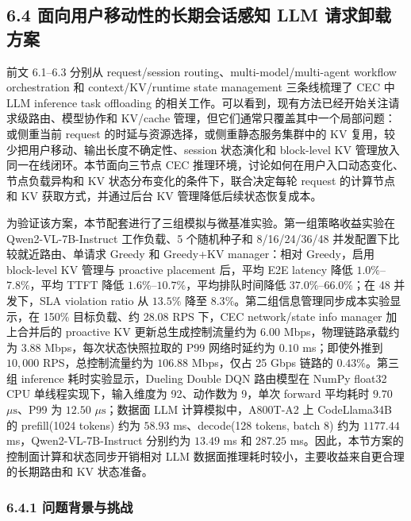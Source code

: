 \subsection*{6.4 面向用户移动性的长期会话感知 LLM 请求卸载方案}

前文 6.1--6.3 分别从 request/session routing、multi-model/multi-agent workflow orchestration 和 context/KV/runtime state management 三条线梳理了 CEC 中 LLM inference task offloading 的相关工作。可以看到，现有方法已经开始关注请求级路由、模型协作和 KV/cache 管理，但它们通常只覆盖其中一个局部问题：或侧重当前 request 的时延与资源选择，或侧重静态服务集群中的 KV 复用，较少把用户移动、输出长度不确定性、session 状态演化和 block-level KV 管理放入同一在线闭环。本节面向三节点 CEC 推理环境，讨论如何在用户入口动态变化、节点负载异构和 KV 状态分布变化的条件下，联合决定每轮 request 的计算节点和 KV 获取方式，并通过后台 KV 管理降低后续状态恢复成本。

为验证该方案，本节配套进行了三组模拟与微基准实验。第一组策略收益实验在 Qwen2-VL-7B-Instruct 工作负载、5 个随机种子和 8/16/24/36/48 并发配置下比较就近路由、单请求 Greedy 和 Greedy+KV manager：相对 Greedy，启用 block-level KV 管理与 proactive placement 后，平均 E2E latency 降低 \(1.0\%\)--\(7.8\%\)，平均 TTFT 降低 \(1.6\%\)--\(10.7\%\)，平均排队时间降低 \(37.0\%\)--\(66.0\%\)；在 48 并发下，SLA violation ratio 从 \(13.5\%\) 降至 \(8.3\%\)。第二组信息管理同步成本实验显示，在 150\% 目标负载、约 28.08 RPS 下，CEC network/state info manager 加上合并后的 proactive KV 更新总生成控制流量约为 \(6.00\) Mbps，物理链路承载约为 \(3.88\) Mbps，每次状态快照拉取的 P99 网络时延约为 \(0.10\) ms；即使外推到 \(10{,}000\) RPS，总控制流量约为 \(106.88\) Mbps，仅占 25 Gbps 链路的 \(0.43\%\)。第三组 inference 耗时实验显示，Dueling Double DQN 路由模型在 NumPy float32 CPU 单线程实现下，输入维度为 92、动作数为 9，单次 forward 平均耗时 \(9.70\) \(\mu\mathrm{s}\)、P99 为 \(12.50\) \(\mu\mathrm{s}\)；数据面 LLM 计算模拟中，A800T-A2 上 CodeLlama34B 的 prefill(1024 tokens) 约为 \(58.93\) ms、decode(128 tokens, batch 8) 约为 \(1177.44\) ms，Qwen2-VL-7B-Instruct 分别约为 \(13.49\) ms 和 \(287.25\) ms。因此，本节方案的控制面计算和状态同步开销相对 LLM 数据面推理耗时较小，主要收益来自更合理的长期路由和 KV 状态准备。

\subsubsection*{6.4.1 问题背景与挑战}

